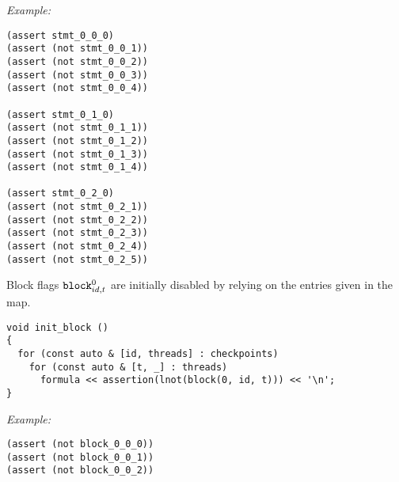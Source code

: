 \noindent
\emph{Example:} 

\begin{lstlisting}[style=smtlib]
(assert stmt_0_0_0)
(assert (not stmt_0_0_1))
(assert (not stmt_0_0_2))
(assert (not stmt_0_0_3))
(assert (not stmt_0_0_4))

(assert stmt_0_1_0)
(assert (not stmt_0_1_1))
(assert (not stmt_0_1_2))
(assert (not stmt_0_1_3))
(assert (not stmt_0_1_4))

(assert stmt_0_2_0)
(assert (not stmt_0_2_1))
(assert (not stmt_0_2_2))
(assert (not stmt_0_2_3))
(assert (not stmt_0_2_4))
(assert (not stmt_0_2_5))
\end{lstlisting}

\noindent
Block flags $\texttt{block}^0_{id, t}$ are initially disabled by relying on the entries given in the  map.

\newpage

\begin{lstlisting}[style=c++]
void init_block ()
{
  for (const auto & [id, threads] : checkpoints)
    for (const auto & [t, _] : threads)
      formula << assertion(lnot(block(0, id, t))) << '\n';
}
\end{lstlisting}

\noindent
\emph{Example:} 

\begin{lstlisting}[style=smtlib]
(assert (not block_0_0_0))
(assert (not block_0_0_1))
(assert (not block_0_0_2))
\end{lstlisting}

